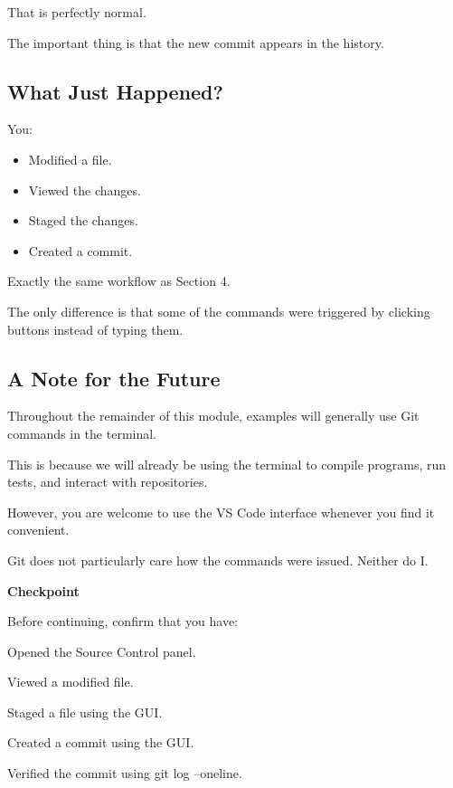 \documentclass{csc2059practical}
\begin{document}
That is perfectly normal.

The important thing is that the new commit appears in the history.

\subsection{What Just Happened?}
You:

\begin{itemize}
  \item Modified a file.
  \item Viewed the changes.
  \item Staged the changes.
  \item Created a commit.
\end{itemize}
Exactly the same workflow as Section 4.

The only difference is that some of the commands were triggered by clicking buttons instead of typing them.

\subsection{A Note for the Future}
Throughout the remainder of this module, examples will generally use Git commands in the terminal.

This is because we will already be using the terminal to compile programs, run tests, and interact with repositories.

However, you are welcome to use the VS Code interface whenever you find it convenient.

Git does not particularly care how the commands were issued. Neither do I.

\begin{reflectionbox}
\textbf{Checkpoint}\par
\medskip

Before continuing, confirm that you have:


Opened the Source Control panel.


Viewed a modified file.


Staged a file using the GUI.


Created a commit using the GUI.


Verified the commit using git log --oneline.


\end{reflectionbox}
\end{document}
